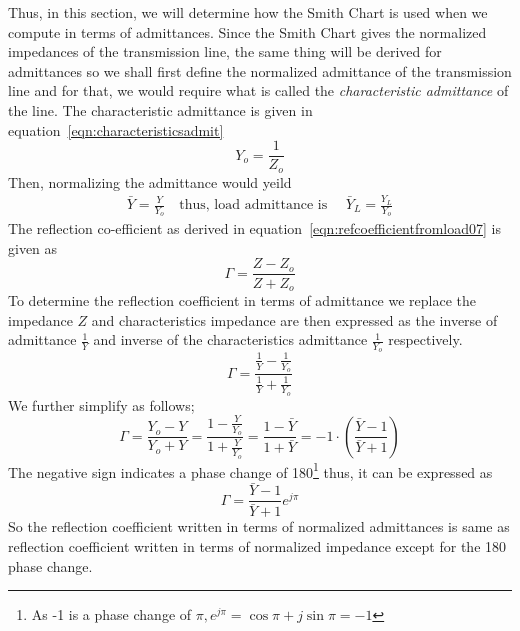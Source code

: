 Thus, in this section, we will determine how the Smith Chart is used when we compute in terms of admittances. Since the Smith Chart gives the normalized impedances of the transmission line, the same thing will be derived for admittances so we shall first define the normalized admittance of the transmission line and for that, we would require what is called the \emph{characteristic admittance} of the line. The characteristic admittance is given in equation~\eqref{eqn:characteristicsadmit}
\begin{equation}
Y_o = \frac{1}{Z_o}\label{eqn:characteristicsadmit}
\end{equation}
Then, normalizing the admittance would yeild
\begin{align*}
\bar{Y} = \frac{Y}{Y_o}\quad\text{thus, load admittance is }\quad\bar{Y}_L = \frac{Y_L}{Y_o}
\end{align*}
The reflection co-efficient as derived in equation~\eqref{eqn:refcoefficientfromload07} is given as
\begin{equation*}
\Gamma = \frac{Z - Z_o}{Z + Z_o} 
\end{equation*}
To determine the reflection coefficient in terms of admittance we replace the impedance $Z$ and characteristics impedance are then expressed as the inverse of admittance $\frac{1}{Y}$ and inverse of the characteristics admittance $\frac{1}{Y_o}$ respectively.
\begin{equation*}
\Gamma = \frac{\frac{1}{Y} - \frac{1}{Y_o}}{\frac{1}{Y} + \frac{1}{Y_o}}
\end{equation*}
We further simplify as follows;
\begin{dmath*}
\Gamma = \frac{Y_o - Y}{Y_o + Y}
= \frac{1 - \frac{Y}{Y_o}}{1 + \frac{Y}{Y_o}}
= \frac{1 - \bar{Y}}{1 + \bar{Y}} = -1\cdot\left(\frac{\bar{Y} - 1}{\bar{Y} + 1}\right)
\end{dmath*}
The negative sign indicates a phase change of 180\textdegree\footnote{
As -1 is a phase change of $\pi, e^{j\pi} = \cos\pi + j\sin\pi = -1$
} thus, it can be expressed as
\begin{equation}
\Gamma = \frac{\bar{Y} - 1}{\bar{Y} + 1}e^{j\pi}
\end{equation}
So the reflection coefficient written in terms of normalized admittances is same as reflection coefficient written in terms of normalized impedance except for the 180\textdegree\; phase change.

